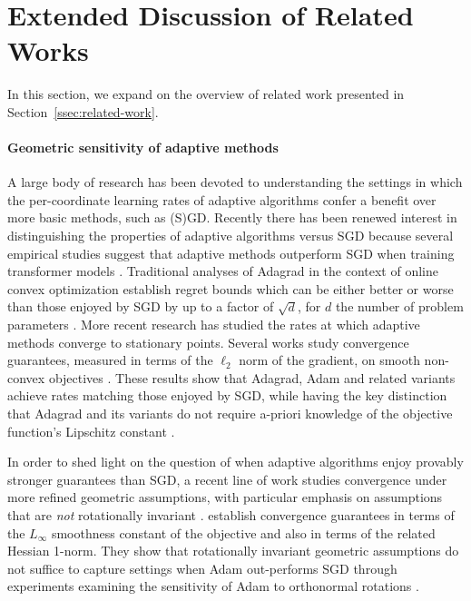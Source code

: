 \section{Extended Discussion of Related Works}\label{sec:extended-related-works}

In this section, we expand on the overview of related work presented in Section~\ref{ssec:related-work}.

\paragraph{Geometric sensitivity of adaptive methods} A large body of research has been devoted to understanding the settings in which the per-coordinate learning rates of adaptive algorithms confer a benefit over more basic methods, such as (S)GD. Recently there has been renewed interest in distinguishing the properties of adaptive algorithms versus SGD because several empirical studies suggest that adaptive methods outperform SGD when training transformer models \cite{kunstner2024heavy,zhang2024transformers}. Traditional analyses of Adagrad in the context of online convex optimization establish regret bounds which can be either better or worse than those enjoyed by SGD by up to a factor of $\sqrt{d}$, for $d$ the number of problem parameters \cite{duchi2011adaptive, pmlr-v247-chen24e}. More recent research has studied the rates at which adaptive methods converge to stationary points. Several works study convergence guarantees, measured in terms of the $\ell_2$ norm of the gradient, on smooth non-convex objectives \cite{ward2020adagrad, defossez2020simple}. These results show that Adagrad, Adam and related variants achieve rates matching those enjoyed by SGD, while having the key distinction that Adagrad and its variants do not require a-priori knowledge of the objective function's Lipschitz constant \cite{ward2020adagrad, defossez2020simple}.

In order to shed light on the question of when adaptive algorithms enjoy provably stronger guarantees than SGD, a recent line of work studies convergence under more refined geometric assumptions, with particular emphasis on assumptions that are \textit{not} rotationally invariant \cite{jiang2024convergence, liu2024adagrad, xie2024adamexploitsellinftygeometryloss}. \citet{xie2024adamexploitsellinftygeometryloss} establish convergence guarantees in terms of the $L_\infty$ smoothness constant of the objective and also in terms of the related Hessian 1-norm. They show that rotationally invariant geometric assumptions do not suffice to capture settings when Adam out-performs SGD through experiments examining the sensitivity of Adam to orthonormal rotations \cite{xie2024adamexploitsellinftygeometryloss}. 


